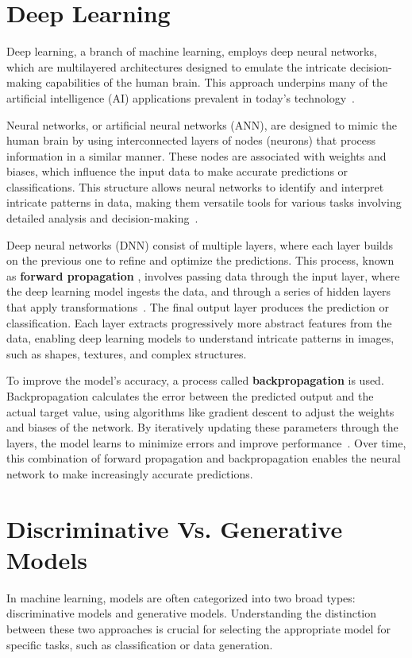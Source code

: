 \documentclass[12pt,DIV14,BCOR12mm,a4paper,footinclude=false,headinclude,parskip=half-,twoside,openright,cleardoublepage=empty,toc=index,bibliography=totoc,listof=totoc]{scrreprt}
\numberwithin{equation}{chapter}
\begin{document}
\section{Deep Learning}
Deep learning, a branch of machine learning, employs deep neural networks, which are multilayered architectures designed to emulate the intricate decision-making capabilities of the human brain. This approach underpins many of the artificial intelligence (AI) applications prevalent in today’s technology~\cite{wuttke2024}.

Neural networks, or artificial neural networks (ANN), are designed to mimic the human brain by using interconnected layers of nodes (neurons) that process information in a similar manner. These nodes are associated with weights and biases, which influence the input data to make accurate predictions or classifications. This structure allows neural networks to identify and interpret intricate patterns in data, making them versatile tools for various tasks involving detailed analysis and decision-making~\cite{hardesty2017explained}.

Deep neural networks (DNN) consist of multiple layers, where each layer builds on the previous one to refine and optimize the predictions. This process, known as \textbf{forward propagation} , involves passing data through the input layer, where the deep learning model ingests the data, and through a series of hidden layers that apply transformations~\cite{luhaniwal2019}. The final output layer produces the prediction or classification. Each layer extracts progressively more abstract features from the data, enabling deep learning models to understand intricate patterns in images, such as shapes, textures, and complex structures.

To improve the model's accuracy, a process called \textbf{backpropagation} is used. Backpropagation calculates the error between the predicted output and the actual target value, using algorithms like gradient descent to adjust the weights and biases of the network. By iteratively updating these parameters through the layers, the model learns to minimize errors and improve performance~\cite{rumelhart1986learning}. Over time, this combination of forward propagation and backpropagation enables the neural network to make increasingly accurate predictions.
\section{Discriminative Vs. Generative Models}
In machine learning, models are often categorized into two broad types: discriminative models and generative models. Understanding the distinction between these two approaches is crucial for selecting the appropriate model for specific tasks, such as classification or data generation.
\end{document}
